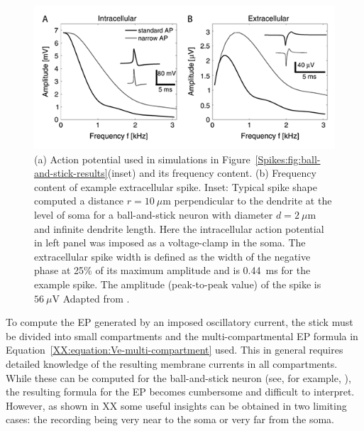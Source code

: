 \begin{figure}[!ht]
\begin{center}
\includegraphics{Figures/Spikes/Spikes-ball-and-stick-frequency-w90-r150}
\end{center}
\caption[]{(a) Action potential used in simulations in Figure~\ref{Spikes:fig:ball-and-stick-results}(inset) 
and its frequency content.
(b) Frequency content of example extracellular spike.
Inset: Typical spike shape computed a distance $r=10~\mu$m
perpendicular to the dendrite at the level of soma for a ball-and-stick 
neuron with diameter $d=2~\mu$m and infinite dendrite length.
Here the intracellular action potential in left panel was imposed as a voltage-clamp in the soma.
The extracellular spike width is defined as the width of the negative phase at 25\% of its maximum
amplitude and is 0.44~ms for the example spike.
The amplitude (peak-to-peak value) of the spike is $56~\mu$V  
Adapted from \citet{Pettersen2008}.}
\label{Spikes:fig:ball-and-stick-frequency}
\end{figure}

To compute the EP generated by an imposed oscillatory current, the stick must be divided into small compartments  
and the multi-compartmental EP formula in Equation~\ref{XX:equation:Ve-multi-compartment} used. 
This in general requires detailed knowledge of the resulting membrane currents in all compartments. 
While these can be computed for the ball-and-stick neuron (see, for example, \citet{Pettersen2014}), 
the resulting formula for the EP becomes cumbersome and difficult to interpret. 
However, as shown in XX
some useful insights can be obtained in two limiting cases: the recording being very near to the soma or very far from the soma.


